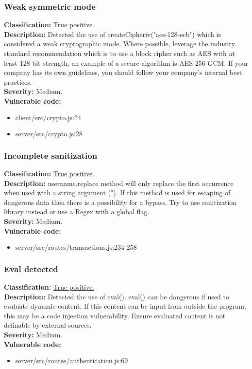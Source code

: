 \documentclass[]{article}
\begin{document}
\subsubsection{Weak symmetric mode}
\textbf{Classification:} \hyperref[subsubsec:use_of_a_broken_or_risky_cryptographic_algorithm]{True positive.} \\ 
\textbf{Description:} Detected the use of createCipheriv("aes-128-ecb") which is considered a weak cryptographic mode. Where possible, 
leverage the industry standard recommendation which is to use a block cipher such as AES with at least 128-bit strength, an example 
of a secure algorithm is AES-256-GCM. If your company has its own guidelines, you should follow your company's internal best practices. \\ 
\textbf{Severity:} Medium. \\ 
\textbf{Vulnerable code:} 
\begin{itemize}
    \item client/src/crypto.js:24
    \item server/src/crypto.js:28
\end{itemize}

\subsubsection{Incomplete sanitization}
\textbf{Classification:} \hyperref[subsubsec:improper_limitation_of_a_pathname_to_a_restricted_directory]{True positive.} \\ 
\textbf{Description:} username.replace method will only replace the first occurrence when used with a string argument ("). 
If this method is used for escaping of dangerous data then there is a possibility for a bypass. Try to use sanitization 
library instead or use a Regex with a global flag. \\ 
\textbf{Severity:} Medium. \\ 
\textbf{Vulnerable code:} 
\begin{itemize}
    \item server/src/routes/transactions.js:234-258
\end{itemize}

\subsubsection{Eval detected}
\textbf{Classification:} \hyperref[subsubsec:improper_neutralization_of_directives_in_dynamically_evaluated_code]{True positive.} \\ 
\textbf{Description:} Detected the use of eval(). eval() can be dangerous if used to evaluate dynamic content. If this 
content can be input from outside the program, this may be a code injection vulnerability. Ensure evaluated content is 
not definable by external sources. \\ 
\textbf{Severity:} Medium. \\ 
\textbf{Vulnerable code:} 
\begin{itemize}
    \item server/src/routes/authentication.js:69
\end{itemize}
\end{document}
